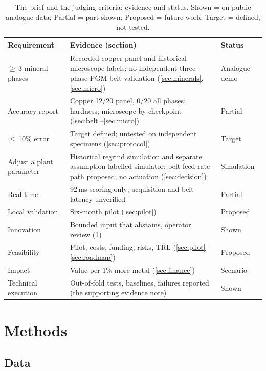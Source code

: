 \documentclass[10pt,a4paper,twocolumn]{article}
\begin{document}
\begin{table}[t]
\centering\footnotesize
\caption{The brief and the judging criteria: evidence and status. Shown = on public analogue data; Partial = part shown; Proposed = future work; Target = defined, not tested.}
\label{tab:map}
\begin{tabularx}{\columnwidth}{@{}L{1.85cm}YL{1.0cm}@{}}
\toprule
Requirement & Evidence (section) & Status \\
\midrule
$\geq$\,3 mineral phases & Recorded copper panel and historical microscope labels; no independent three-phase PGM belt validation (\ref{sec:minerals}, \ref{sec:micro}) & Analogue demo \\
Accuracy report & Copper 12/20 panel, 0/20 all phases; hardness; microscope by checkpoint (\ref{sec:belt}--\ref{sec:micro}) & Partial \\
$\leq$\,10\% error & Target defined; untested on independent specimens (\ref{sec:protocol}) & Target \\
Adjust a plant parameter & Historical regrind simulation and separate assumption-labelled simulator; belt feed-rate path proposed; no actuation (\ref{sec:decision}) & Simulation \\
Real time & 92\,ms scoring only; acquisition and belt latency unverified & Partial \\
Local validation & Six-month pilot (\ref{sec:pilot}) & Proposed \\
\midrule
Innovation & Bounded input that abstains, operator review (\ref{sec:methods}) & Shown \\
Feasibility & Pilot, costs, funding, risks, TRL (\ref{sec:pilot}--\ref{sec:roadmap}) & Proposed \\
Impact & Value per 1\% more metal (\ref{sec:finance}) & Scenario \\
Technical execution & Out-of-fold tests, baselines, failures reported (the supporting evidence note) & Shown \\
\bottomrule
\end{tabularx}
\end{table}

\section{Methods}\label{sec:methods}

\subsection{Data}
\end{document}
